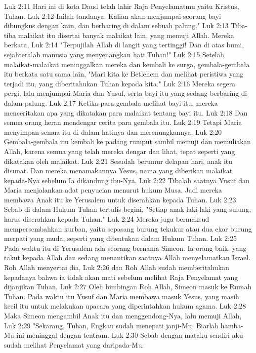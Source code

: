 Luk 2:11  Hari ini di kota Daud telah lahir Raja Penyelamatmu yaitu Kristus, Tuhan.
Luk 2:12  Inilah tandanya: Kalian akan menjumpai seorang bayi dibungkus dengan kain, dan berbaring di dalam sebuah palung."
Luk 2:13  Tiba-tiba malaikat itu disertai banyak malaikat lain, yang memuji Allah. Mereka berkata,
Luk 2:14  "Terpujilah Allah di langit yang tertinggi! Dan di atas bumi, sejahteralah manusia yang menyenangkan hati Tuhan!"
Luk 2:15  Setelah malaikat-malaikat meninggalkan mereka dan kembali ke surga, gembala-gembala itu berkata satu sama lain, "Mari kita ke Betlehem dan melihat peristiwa yang terjadi itu, yang diberitahukan Tuhan kepada kita."
Luk 2:16  Mereka segera pergi, lalu menjumpai Maria dan Yusuf, serta bayi itu yang sedang berbaring di dalam palung.
Luk 2:17  Ketika para gembala melihat bayi itu, mereka menceritakan apa yang dikatakan para malaikat tentang bayi itu.
Luk 2:18  Dan semua orang heran mendengar cerita para gembala itu.
Luk 2:19  Tetapi Maria menyimpan semua itu di dalam hatinya dan merenungkannya.
Luk 2:20  Gembala-gembala itu kembali ke padang rumput sambil memuji dan memuliakan Allah, karena semua yang telah mereka dengar dan lihat, tepat seperti yang dikatakan oleh malaikat.
Luk 2:21  Sesudah berumur delapan hari, anak itu disunat. Dan mereka menamakannya Yesus, nama yang diberikan malaikat kepada-Nya sebelum Ia dikandung ibu-Nya.
Luk 2:22  Tibalah saatnya Yusuf dan Maria menjalankan adat penyucian menurut hukum Musa. Jadi mereka membawa Anak itu ke Yerusalem untuk diserahkan kepada Tuhan.
Luk 2:23  Sebab di dalam Hukum Tuhan tertulis begini, "Setiap anak laki-laki yang sulung, harus diserahkan kepada Tuhan."
Luk 2:24  Mereka juga bermaksud mempersembahkan kurban, yaitu sepasang burung tekukur atau dua ekor burung merpati yang muda, seperti yang ditentukan dalam Hukum Tuhan.
Luk 2:25  Pada waktu itu di Yerusalem ada seorang bernama Simeon. Ia orang baik, yang takut kepada Allah dan sedang menantikan saatnya Allah menyelamatkan Israel. Roh Allah menyertai dia,
Luk 2:26  dan Roh Allah sudah memberitahukan kepadanya bahwa ia tidak akan mati sebelum melihat Raja Penyelamat yang dijanjikan Tuhan.
Luk 2:27  Oleh bimbingan Roh Allah, Simeon masuk ke Rumah Tuhan. Pada waktu itu Yusuf dan Maria membawa masuk Yesus, yang masih kecil itu untuk melakukan upacara yang diperintahkan hukum agama.
Luk 2:28  Maka Simeon mengambil Anak itu dan menggendong-Nya, lalu memuji Allah,
Luk 2:29  "Sekarang, Tuhan, Engkau sudah menepati janji-Mu. Biarlah hamba-Mu ini meninggal dengan tentram.
Luk 2:30  Sebab dengan mataku sendiri aku sudah melihat Penyelamat yang daripada-Mu.

